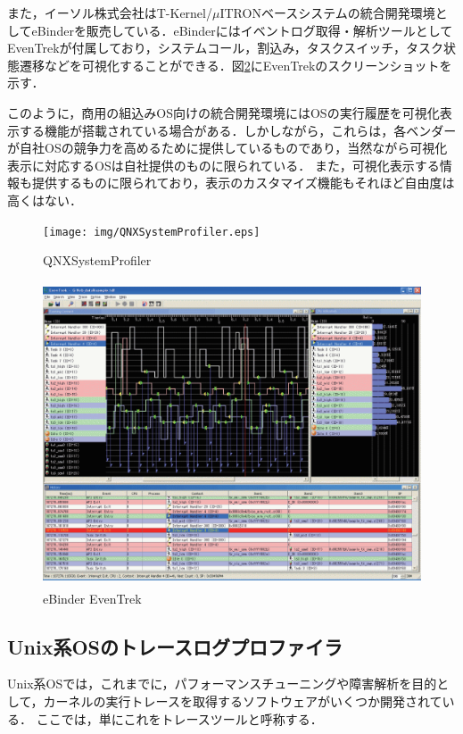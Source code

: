 また，イーソル株式会社はT-Kernel/$\mu$ITRONベースシステムの統合開発環境としてeBinder\cite{eBinder}を販売している．eBinderにはイベントログ取得・解析ツールとしてEvenTrekが付属しており，システムコール，割込み，タスクスイッチ，タスク状態遷移などを可視化することができる．図\ref{fig:EvenTrek}にEvenTrekのスクリーンショットを示す．

このように，商用の組込みOS向けの統合開発環境にはOSの実行履歴を可視化表示する機能が搭載されている場合がある．しかしながら，これらは，各ベンダーが自社OSの競争力を高めるために提供しているものであり，当然ながら可視化表示に対応するOSは自社提供のものに限られている．
また，可視化表示する情報も提供するものに限られており，表示のカスタマイズ機能もそれほど自由度は高くはない．

\begin{figure}[p]
\begin{center}
\texttt{[image: img/QNXSystemProfiler.eps]}
\caption{QNXSystemProfiler}
\label{fig:QNXSystemProfiler}
\end{center}
\end{figure}

\begin{figure}[p]
\begin{center}
\includegraphics[height=9cm]{img/EvenTrek.eps}
\caption{eBinder EvenTrek}
\label{fig:EvenTrek}
\end{center}
\end{figure}

\subsection{Unix系OSのトレースログプロファイラ}

Unix系OSでは，これまでに，パフォーマンスチューニングや障害解析を目的として，カーネルの実行トレースを取得するソフトウェアがいくつか開発されている．
ここでは，単にこれをトレースツールと呼称する．

